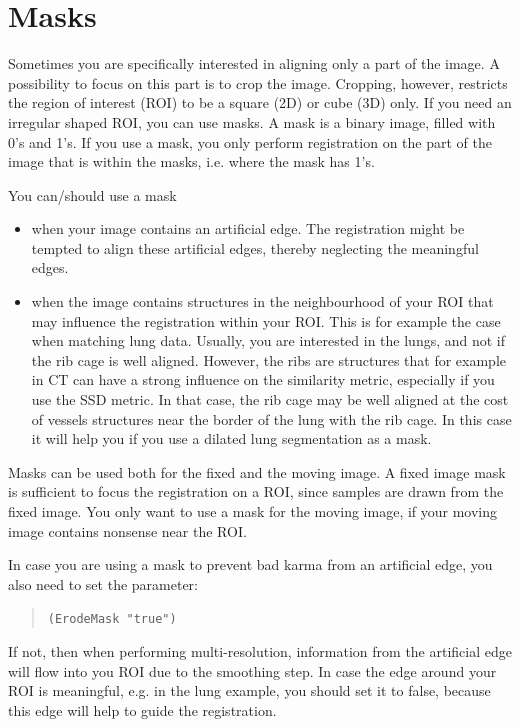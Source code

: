 \documentclass[]{report}
\begin{document}
\section{Masks}

Sometimes you are specifically interested in aligning only a part of
the image. A possibility to focus on this part is to crop the image.
Cropping, however, restricts the region of interest (ROI) to be a
square (2D) or cube (3D) only. If you need an irregular shaped ROI,
you can use masks. A mask is a binary image, filled with 0's and 1's.
If you use a mask, you only perform registration on the part of the
image that is within the masks, i.e. where the mask has 1's.

You can/should use a mask
\begin{itemize}
\item when your image contains an artificial edge. The registration
might be tempted to align these artificial edges, thereby neglecting
the meaningful edges.

\item when the image contains structures in the neighbourhood
of your ROI that may influence the registration within your ROI. This
is for example the case when matching lung data. Usually, you are
interested in the lungs, and not if the rib cage is well aligned.
However, the ribs are structures that for example in CT can have a
strong influence on the similarity metric, especially if you use the
SSD metric. In that case, the rib cage may be well aligned at the
cost of vessels structures near the border of the lung with the rib
cage. In this case it will help you if you use a dilated lung
segmentation as a mask.
\end{itemize}

Masks can be used both for the fixed and the moving image. A fixed
image mask is sufficient to focus the registration on a ROI, since
samples are drawn from the fixed image. You only want to use a mask
for the moving image, if your moving image contains nonsense near the
ROI.

In case you are using a mask to prevent bad karma from an artificial
edge, you also need to set the parameter:
\begin{quote}
\texttt{(ErodeMask "true")}
\end{quote}
If not, then when performing multi-resolution, information from the
artificial edge will flow into you ROI due to the smoothing step. In
case the edge around your ROI is meaningful, e.g. in the lung
example, you should set it to false, because this edge will help to
guide the registration.
\end{document}
